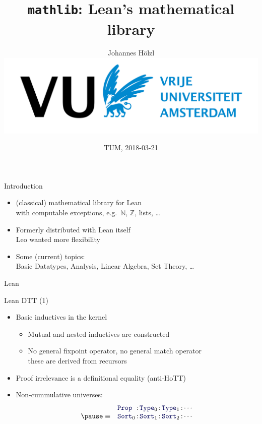 \documentclass{beamer}
\title{\texttt{mathlib}: Lean's mathematical library }
\author{Johannes Hölzl \\ \includegraphics{vulogo.png}}
\date{TUM, 2018-03-21}
\newcommand{\ident}[1]{{\color{blue!33!black}\ensuremath{\mathtt{#1}}}}
\newcommand{\sect}[1]{\begin{frame}
\begin{center} \Huge{\usebeamercolor[fg]{structure} #1} \end{center}
\end{frame}
}
\begin{document}
\maketitle

\begin{frame}{Introduction}
  \begin{itemize}[<+->]
    \item (classical) mathematical library for Lean \\
      with computable exceptions, e.g.~$\mathbb{N}$, $\mathbb{Z}$, lists, \ldots
    \item Formerly distributed with Lean itself \\
          Leo wanted more flexibility
    \item Some (current) topics: \\
      Basic Datatypes, Analysis, Linear Algebra, Set Theory, \ldots
  \end{itemize}
\end{frame}

\sect{Lean}

\begin{frame}{Lean DTT (1)}
  \begin{itemize}[<+->]
    \item Basic inductives in the kernel
    \begin{itemize}
      \item Mutual and nested inductives are constructed
      \item No general fixpoint operator, no general match operator \\
        these are derived from recursors
    \end{itemize}
    \item Proof irrelevance is a definitional equality (anti-HoTT)
    \item Non-cummulative universes:
      \[ \begin{array}{ll@{\,}c@{\,}l@{\,}c@{\,}l@{\,}c@{\,}l}
        & \ident{Prop} & : & \ident{Type}_0 & : & \ident{Type}_1 & : & \cdots \\
        \pause
        \equiv & \ident{Sort}_0 & : & \ident{Sort}_1 & : & \ident{Sort}_2 & : & \cdots 
      \end{array} \]
  \end{itemize}
\end{frame}
\end{document}
